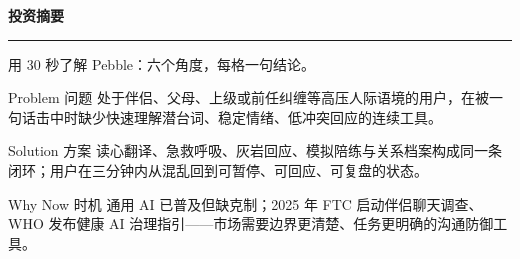 \documentclass[UTF8,11pt,a4paper]{ctexart}
\begin{document}
\thispagestyle{plain}

\vspace*{-2mm}
{\sffamily\Large\bfseries\color{PebbleInk}投资摘要}

\vspace{2mm}
{\color{PebbleAccent}\rule{\textwidth}{1pt}}
\vspace{4mm}

{\small\color{PebbleMute}用 30 秒了解 Pebble：六个角度，每格一句结论。}
\vspace{4mm}

\noindent
\begin{minipage}[t]{0.31\textwidth}
\begin{snapshotcell}{Problem 问题}
处于伴侣、父母、上级或前任纠缠等高压人际语境的用户，在被一句话击中时缺少快速理解潜台词、稳定情绪、低冲突回应的连续工具。
\end{snapshotcell}
\end{minipage}\hfill
\begin{minipage}[t]{0.31\textwidth}
\begin{snapshotcell}{Solution 方案}
读心翻译、急救呼吸、灰岩回应、模拟陪练与关系档案构成同一条闭环；用户在三分钟内从混乱回到可暂停、可回应、可复盘的状态。
\end{snapshotcell}
\end{minipage}\hfill
\begin{minipage}[t]{0.31\textwidth}
\begin{snapshotcell}{Why Now 时机}
通用 AI 已普及但缺克制；2025 年 FTC 启动伴侣聊天调查、WHO 发布健康 AI 治理指引——市场需要边界更清楚、任务更明确的沟通防御工具。
\end{snapshotcell}
\end{minipage}

\vspace{3mm}
\end{document}
